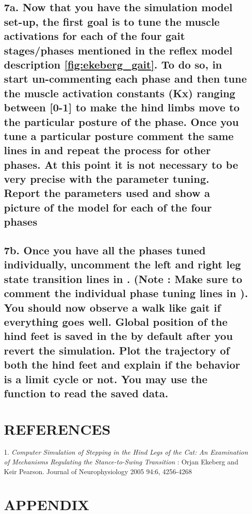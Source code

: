 \documentclass{cmc}
\begin{document}
\subsection*{7a. Now that you have the simulation model set-up, the
  first goal is to tune the muscle activations for each of the four
  gait stages/phases mentioned in the reflex model description
  \ref{fig:ekeberg_gait}. To do so, in  start
  un-commenting each phase and then tune the muscle activation
  constants (Kx) ranging between [0-1] to make the hind limbs move to
  the particular posture of the phase. Once you tune a particular
  posture comment the same lines in  and
  repeat the process for other phases. At this point it is not
  necessary to be very precise with the parameter tuning.  Report the
  parameters used and show a picture of the model for each of the four
  phases}

\subsection*{7b. Once you have all the phases tuned individually,
  uncomment the left and right leg state transition lines in
  .  (Note : Make sure to comment the
  individual phase tuning lines in ). You
  should now observe a walk like gait if everything goes well. Global
  position of the hind feet is saved in the
   by default after you revert the
  simulation. Plot the trajectory of both the hind feet and explain if
  the behavior is a limit cycle or not. You may use the function
   to read the saved
  data.}

\newpage

\section*{REFERENCES}
\label{sec:references}

1. \textit{Computer Simulation of Stepping in the Hind Legs of the
  Cat: An Examination of Mechanisms Regulating the Stance-to-Swing
  Transition} : Orjan Ekeberg and Keir Pearson. Journal of
Neurophysiology 2005 94:6, 4256-4268
\href{https://www.physiology.org/doi/abs/10.1152/jn.00065.2005}{}


\newpage
\section*{APPENDIX}
\label{sec:appendix}
\end{document}
